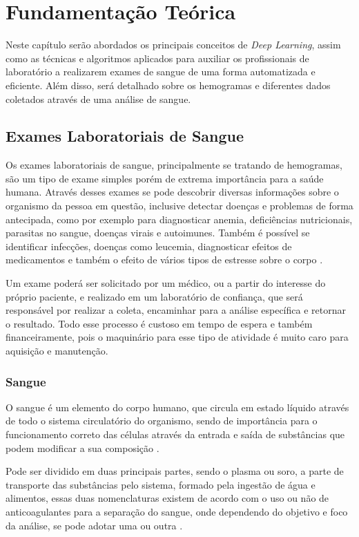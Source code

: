 \chapter{Fundamentação Teórica}
\label{chap:fund}

Neste capítulo serão abordados os principais conceitos de \emph{Deep Learning}, assim como as técnicas e algoritmos aplicados para auxiliar os profissionais de laboratório a realizarem exames de sangue de uma forma automatizada e eficiente. Além disso, será detalhado sobre os hemogramas e diferentes dados coletados através de uma análise de sangue.

\section{Exames Laboratoriais de Sangue}
\label{sec:conceito1}
Os exames laboratoriais de sangue, principalmente se tratando de hemogramas, são um tipo de exame simples porém de extrema importância para a saúde humana. Através desses exames se pode descobrir diversas informações sobre o organismo da pessoa em questão, inclusive detectar doenças e problemas de forma antecipada, como por exemplo para diagnosticar anemia, deficiências nutricionais, parasitas no sangue, doenças virais e autoimunes. Também é possível se identificar infecções, doenças como leucemia, diagnosticar efeitos de medicamentos e também o efeito de vários tipos de estresse sobre o corpo \cite{abcOfCbc, atlasDeHematologiaEAnalise}.

Um exame poderá ser solicitado por um médico, ou a partir do interesse do próprio paciente, e realizado em um laboratório de confiança, que será responsável por realizar a coleta, encaminhar para a análise específica e retornar o resultado. Todo esse processo é custoso em tempo de espera e também financeiramente, pois o maquinário para esse tipo de atividade é muito caro para aquisição e manutenção.

\subsection{Sangue}
O sangue é um elemento do corpo humano, que circula em estado líquido através de todo o sistema circulatório do organismo, sendo de importância para o funcionamento correto das células através da entrada e saída de substâncias que podem modificar a sua composição \cite{manualHematologia}.

Pode ser dividido em duas principais partes, sendo o plasma ou soro, a parte de transporte das substâncias pelo sistema, formado pela ingestão de água e alimentos, essas duas nomenclaturas existem de acordo com o uso ou não de anticoagulantes para a separação do sangue, onde dependendo do objetivo e foco da análise, se pode adotar uma ou outra \cite{manualHematologia}.


